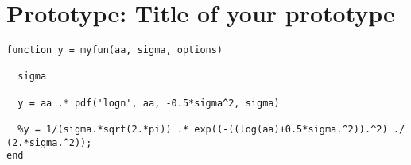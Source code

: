 \documentclass[Main]{subfiles}
\begin{document}
\chapter{Prototype: Title of your prototype}

\begin{lstlisting}
function y = myfun(aa, sigma, options)

  sigma

  y = aa .* pdf('logn', aa, -0.5*sigma^2, sigma)

  %y = 1/(sigma.*sqrt(2.*pi)) .* exp((-((log(aa)+0.5*sigma.^2)).^2) ./ (2.*sigma.^2));
end
\end{lstlisting}
\end{document}
